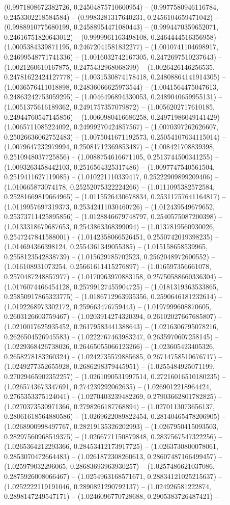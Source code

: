 (0.9971808672382726, 0.24504875710600954) -- (0.9977580946116784, 0.2453302218584584) -- (0.9983281317640231, 0.2456104659471042) -- (0.9988910775680199, 0.24588954471080443) -- (0.9994470359652071, 0.24616751820643012) -- (0.9999961163498108, 0.2464444516356958) -- (1.0005384339871195, 0.24672041581832277) -- (1.0010741104698917, 0.24699548771741336) -- (1.0016032742167305, 0.2472697510237643) -- (1.0021260610167875, 0.2475432968068399) -- (1.0026426146256535, 0.24781622424127778) -- (1.0031530874178418, 0.24808864141914305) -- (1.0036576411018898, 0.24836066625973544) -- (1.0041564475047613, 0.24863242753059295) -- (1.0046496894330053, 0.2489040659955131) -- (1.0051375616189362, 0.2491757357079872) -- (1.0056202717610185, 0.24944760547145856) -- (1.0060980416686258, 0.24971986049141429) -- (1.0065711085224092, 0.24999270424857567) -- (1.0070397262626607, 0.25026636062752483) -- (1.0075041671192573, 0.25054107634115014) -- (1.0079647232979994, 0.25081712369853487) -- (1.008421708839398, 0.2510948037725856) -- (1.0088754616671105, 0.2513744500341255) -- (1.0093263458442103, 0.2516564325317486) -- (1.0097747540561504, 0.2519411627119085) -- (1.010221110339417, 0.25222909899209406) -- (1.010665873074178, 0.25252075322224266) -- (1.0111095382572584, 0.25281669819664965) -- (1.0115526430678834, 0.25311757641164817) -- (1.0119957697319373, 0.25342411030460726) -- (1.012439549679652, 0.25373711425895856) -- (1.0128846679748797, 0.2540575087200398) -- (1.0133318679687653, 0.2543863368399094) -- (1.0137819560930026, 0.2547247841588001) -- (1.0142358066526451, 0.2550742019398235) -- (1.014694366398124, 0.2554361349055385) -- (1.015158658539965, 0.2558123542838739) -- (1.015629785702523, 0.2562048972600552) -- (1.016108931073254, 0.25661611415276897) -- (1.016597356661078, 0.2570487248857977) -- (1.0170963970883158, 0.25750588660336304) -- (1.0176074466454128, 0.25799127455904725) -- (1.0181319363533865, 0.25850917865323775) -- (1.0186712963935356, 0.2590646181232614) -- (1.0192268973302172, 0.259663476759443) -- (1.0197999608870605, 0.2603126603759467) -- (1.0203914274320394, 0.26102027667685807) -- (1.0210017625935452, 0.26179583441388643) -- (1.0216306795078216, 0.2626504526945583) -- (1.0222767463983247, 0.2635970607258145) -- (1.0229368426738026, 0.26465055066123266) -- (1.023605423405326, 0.2658278183260324) -- (1.0242735579885685, 0.26714758510676717) -- (1.0249277352655928, 0.2686298379445951) -- (1.0255484925071199, 0.27029465902352257) -- (1.0261090531997514, 0.27216016510180235) -- (1.0265743673347691, 0.274239292062635) -- (1.0269012218964424, 0.2765353375124041) -- (1.0270403239482269, 0.27903662801782825) -- (1.0270373530971366, 0.2798266187768894) -- (1.0270113073656137, 0.28061618564880586) -- (1.0269622089822454, 0.28140465478206905) -- (1.0268900998497767, 0.28219135326202993) -- (1.0267950415093503, 0.28297560968519375) -- (1.0266771150879848, 0.2837567547322256) -- (1.0265364212293366, 0.28453412173917725) -- (1.0263730800078061, 0.2853070472664483) -- (1.0261872308260613, 0.28607487166499457) -- (1.025979032296065, 0.28683693963930257) -- (1.0257486621037086, 0.2875926008066467) -- (1.0254963168571671, 0.28834121025215637) -- (1.0252222119191046, 0.2890821290792137) -- (1.024926581222874, 0.2898147249547171) -- (1.0246096770728688, 0.2905383726487421) -- 